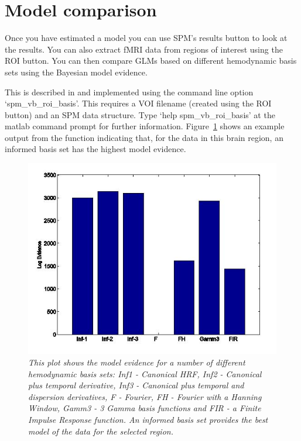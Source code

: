 \documentclass[a4paper,titlepage]{book}
\begin{document}
\section{Model comparison}

Once you have estimated a model you can use SPM's results button
to look at the results. You can also extract fMRI data from 
regions of interest using the ROI button. You 
can then compare GLMs based on different hemodynamic basis sets 
using the Bayesian model evidence. 

This is described in \cite{vb4} and implemented 
using the command line option `spm\_vb\_roi\_basis'. This 
requires a VOI filename (created using the ROI button) and an SPM
data structure. Type `help spm\_vb\_roi\_basis' at the matlab command 
prompt for further information. Figure~\ref{basis} shows an 
example output from the function indicating that, for the data in 
this brain region, an informed basis set has the highest model evidence.

\begin{figure}
\includegraphics[width=150mm]{basis}
\caption{\em This plot shows the model evidence for a number 
of different hemodynamic basis sets: Inf1 - Canonical HRF, Inf2 - Canonical plus temporal derivative, Inf3 - Canonical plus 
temporal and dispersion derivatives, F - Fourier, FH - Fourier 
with a Hanning Window, Gamm3 - 3 Gamma basis functions and FIR - 
a Finite Impulse Response function. An informed basis set provides 
the best model of the data for the selected region.  \label{basis}}
\end{figure}

%



\end{document}
